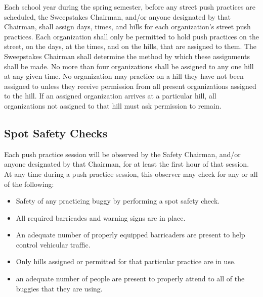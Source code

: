 	Each school year during the spring semester, before any street push practices are scheduled, the Sweepstakes Chairman, and/or anyone designated by that Chairman, shall assign days, times, and hills for each organization's street push practices. Each organization shall only be permitted to hold push practices on the street, on the days, at the times, and on the hills, that are assigned to them. The Sweepstakes Chairman shall determine the method by which these assignments shall be made. No more than four organizations shall be assigned to any one hill at any given time. No organization may practice on a hill they have not been assigned to unless they receive permission from all present organizations assigned to the hill. If an assigned organization arrives at a particular hill, all organizations not assigned to that hill must ask permission to remain.

\subsection{Spot Safety Checks}

	Each push practice session will be observed by the Safety Chairman, and/or anyone designated by that Chairman, for at least the first hour of that session. At any time during a push practice session, this observer may check for any or all of the following:

	\begin{itemize}

		\item Safety of any practicing buggy by performing a spot safety check.

		\item All required barricades and warning signs are in place.

		\item An adequate number of properly equipped barricaders are present to help control vehicular traffic.

		\item Only hills assigned or permitted for that particular practice are in use.

		\item an adequate number of people are present to properly attend to all of the buggies that they are using.

	\end{itemize}


